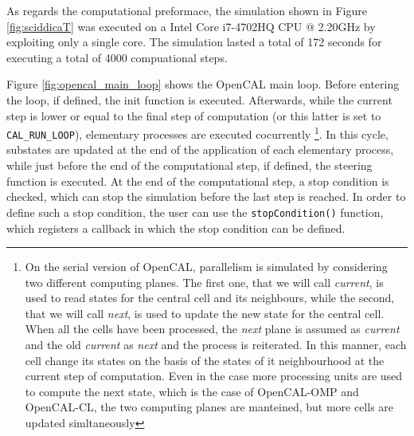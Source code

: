 As regards the computational preformace, the simulation shown in
Figure \ref{fig:sciddicaT} was executed on a Intel Core i7-4702HQ CPU
@ 2.20GHz by exploiting only a single core. The simulation lasted a
total of 172 seconds for executing a total of 4000 compuational steps.

Figure \ref{fig:opencal_main_loop} shows the OpenCAL main loop. Before
entering the loop, if defined, the init function is
executed. Afterwards, while the current step is lower or equal to the
final step of computation (or this latter is set to
\verb'CAL_RUN_LOOP'), elementary processes are executed
cocurrently \footnote{On the serial version of OpenCAL, parallelism is
  simulated by considering two different computing planes. The first
  one, that we will call \emph{current}, is used to read states for
  the central cell and its neighbours, while the second, that we will
  call \emph{next}, is used to update the new state for the central
  cell. When all the cells have been processed, the \emph{next} plane
  is assumed as \emph{current} and the old \emph{current} as
  \emph{next} and the process is reiterated. In this manner, each cell
  change its states on the basis of the states of it neighbourhood at
  the current step of computation. Even in the case more processing
  units are used to compute the next state, which is the case of
  OpenCAL-OMP and OpenCAL-CL, the two computing planes are manteined,
  but more cells are updated simltaneously}. In this cycle, substates
are updated at the end of the application of each elementary process,
while just before the end of the computational step, if defined, the
steering function is executed. At the end of the computational step, a
stop condition is checked, which can stop the simulation before the
last step is reached. In order to define such a stop condition, the
user can use the \verb'stopCondition()' function, which registers a
callback in which the stop condition can be defined.

